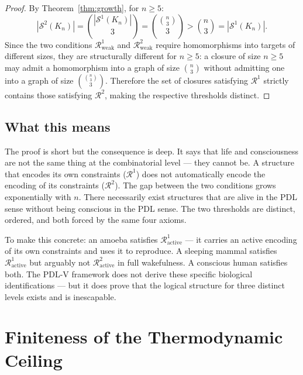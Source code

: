 \documentclass[12pt,a4paper]{article}
\theoremstyle{plain}
\theoremstyle{definition}
\theoremstyle{remark}
\newcommand{\Sop}{\mathcal{S}}
\newcommand{\Rop}{\mathcal{R}}
\begin{document}
\begin{proof}
By Theorem~\ref{thm:growth}, for $n \geq 5$:
\begin{equation}
|\Sop^2(K_n)| = \binom{|\Sop^1(K_n)|}{3} = \binom{\binom{n}{3}}{3} > \binom{n}{3} = |\Sop^1(K_n)|.
\end{equation}
Since the two conditions $\Rop^1_{\mathrm{weak}}$ and $\Rop^2_{\mathrm{weak}}$ require
homomorphisms into targets of different sizes, they are structurally different for $n
\geq 5$: a closure of size $n \geq 5$ may admit a homomorphism into a graph of size
$\binom{n}{3}$ without admitting one into a graph of size $\binom{\binom{n}{3}}{3}$.
Therefore the set of closures satisfying $\Rop^1$ strictly contains those satisfying
$\Rop^2$, making the respective thresholds distinct.
\end{proof}

\subsection{What this means}

The proof is short but the consequence is deep. It says that life and consciousness
are not the same thing at the combinatorial level --- they cannot be. A structure that
encodes its own constraints ($\Rop^1$) does not automatically encode the encoding of
its constraints ($\Rop^2$). The gap between the two conditions grows exponentially with
$n$. There necessarily exist structures that are alive in the PDL sense without being
conscious in the PDL sense. The two thresholds are distinct, ordered, and both forced
by the same four axioms.

To make this concrete: an amoeba satisfies $\Rop^1_{\mathrm{active}}$ --- it carries
an active encoding of its own constraints and uses it to reproduce. A sleeping mammal
satisfies $\Rop^1_{\mathrm{active}}$ but arguably not $\Rop^2_{\mathrm{active}}$ in
full wakefulness. A conscious human satisfies both. The PDL-V framework does not
derive these specific biological identifications --- but it does prove that the
logical structure for three distinct levels exists and is inescapable.

\section{Finiteness of the Thermodynamic Ceiling}
\label{sec:ceiling}
\end{document}
